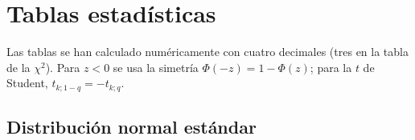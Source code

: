 \chapter{Tablas estadísticas}
\label{ap:tablas}

Las tablas se han calculado numéricamente con cuatro decimales (tres en la tabla de la $\chi^{2}$). Para $z<0$ se usa la simetría $\Phi(-z)=1-\Phi(z)$; para la $t$ de Student, $t_{k;1-q}=-t_{k;q}$.

\section{Distribución normal estándar}

